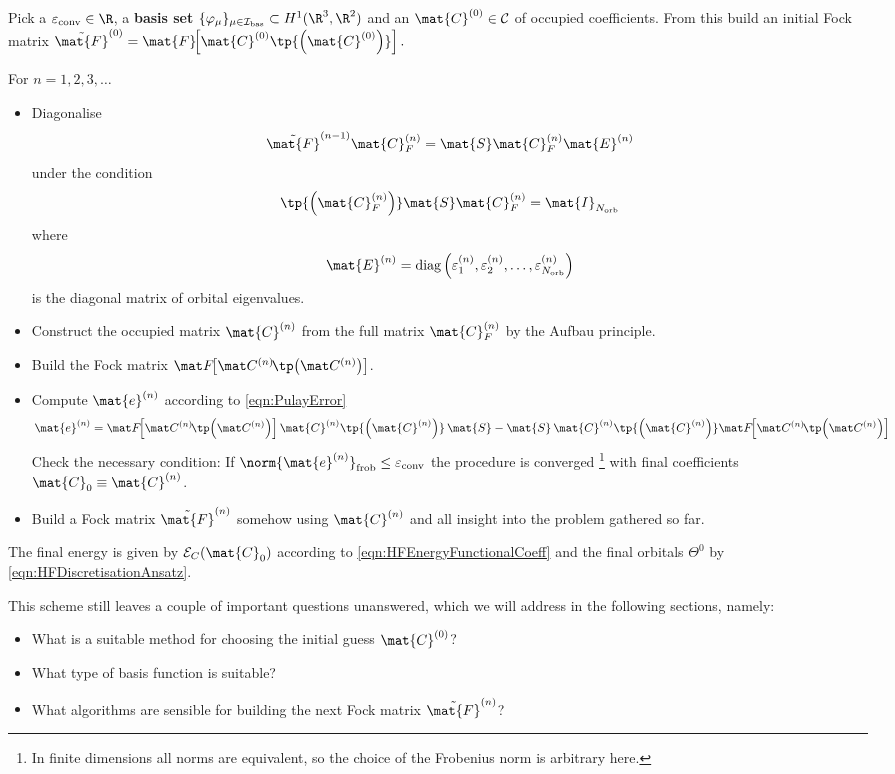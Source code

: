 \begin{rem}
	\label{rem:SCFcoeff}
	Pick a  $\epsilonconv \in \R$,
	a \textbf{basis set} $\{\varphi_\mu\}_{\mu\in\Ibas} \subset H^1(\R^3, \R^2)$
	and an  $\mat{C}^{(0)} \in \mathcal{C}$
	of occupied coefficients.
	From this build an initial Fock matrix
	$\tilde{\mat{F}}^{(0)} = \mat{F}\!\!\left[\mat{C}^{(0)} \tp{\left(\mat{C}^{(0)}\right)}\right].$

	\noindent
	For $n=1,2,3,\ldots$
	\begin{itemize}
		\item Diagonalise
			\[ \tilde{\mat{F}}^{(n-1)} \mat{C}_F^{(n)} = \mat{S} \mat{C}_F^{(n)} \mat{E}^{(n)} \]
			under the condition
			\[ \tp{\left(\mat{C}_F^{(n)}\right)} \mat{S}  \mat{C}_F^{(n)} = \mat{I}_{\Norb} \]
			where
			\[
				\mat{E}^{(n)}
				= \text{diag}\left(\varepsilon_1^{(n)},
				\varepsilon_2^{(n)}, \ldots,
				\varepsilon_{\Norb}^{(n)}\right)
			\]
			is the diagonal matrix of orbital eigenvalues.
		\item Construct the occupied matrix $\mat{C}^{(n)}$
			from the full matrix $\mat{C}_F^{(n)}$ by the Aufbau principle.
		\item Build the Fock matrix $\matFnfull$.
		\item Compute $\mat{e}^{(n)}$ according to \eqref{eqn:PulayError}
			\[
			\mat{e}^{(n)}
			= \matFnfull \mat{C}^{(n)} \tp{\left(\mat{C}^{(n)}\right)} \, \mat{S}
			- \mat{S} \, \mat{C}^{(n)} \tp{\left(\mat{C}^{(n)}\right)} \matFnfull
			\]
			Check the necessary condition:
			If $\norm{ \mat{e}^{(n)} }_\text{frob} \leq  \epsilonconv$
			the procedure is converged%
			\footnote{In finite dimensions all norms are equivalent,
				so the choice of the Frobenius norm is arbitrary here.}
			with final coefficients $\mat{C}_0 \equiv \mat{C}^{(n)}$.
		\item Build a Fock matrix $\tilde{\mat{F}}^{(n)}$ somehow
			using $\mat{C}^{(n)}$ and all insight into the problem gathered so far.
	\end{itemize}
	The final \HF energy is given by $\mathcal{E}_C(\mat{C}_0)$
	according to \eqref{eqn:HFEnergyFunctionalCoeff} and the final
	\SCF orbitals $\Theta^0$ by \eqref{eqn:HFDiscretisationAnsatz}.
\end{rem}
This scheme still leaves a couple of important questions unanswered,
which we will address in the following sections, namely:
\begin{itemize}
	\item What is a suitable method for choosing the initial guess $\mat{C}^{(0)}$?
	\item What type of basis function is suitable?
	\item What algorithms are sensible for building the next
		Fock matrix $\tilde{\mat{F}}^{(n)}$?
\end{itemize}
